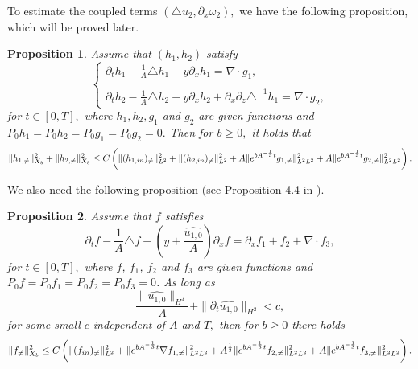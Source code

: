 \documentclass[12pt, reqno]{amsart}
\newtheorem{proposition}{Proposition}[section]
\numberwithin{equation}{section}
\begin{document}
	To estimate the coupled terms $(\triangle u_2,\partial_x\omega_2),$ we have 
	the following proposition, which will be proved later.
	\begin{proposition}\label{timespace1}
		Assume that $(h_1,h_2)$ satisfy
		\begin{equation*}\label{h1}
			\left\{
			\begin{array}{lr}
				\partial_th_1-\frac{1}{A}\triangle h_1+y\partial_x  h_1=
				\nabla\cdot g_1 , \\
				
				\\
				\partial_th_2-\frac{1}{A}\triangle h_2+y\partial_x  h_2+\partial_x\partial_z\triangle^{-1}h_1
				=\nabla\cdot g_2,
			\end{array}
			\right.
		\end{equation*}
		for $ t\in[0,T], $ where $ h_{1},h_{2}, g_{1} $ and $ g_{2} $ are given functions and $ P_{0}h_{1}=P_{0}h_{2}=P_{0}g_{1}=P_{0}g_{2}=0.$ Then for $ b\geq 0, $ it holds that 
		\begin{equation*}
			\|h_{1,\neq}\|^2_{X_b}+	\|h_{2,\neq}\|^2_{X_b}\leq C\left(\|(h_{1,\rm in})_{\neq}\|^2_{L^2}+
			\|(h_{2,\rm in})_{\neq}\|^2_{L^2}
			+A\|{\rm e}^{bA^{-\frac{1}{3}}t}g_{1,\neq}\|_{L^2L^2}^2
			+A\|{\rm e}^{bA^{-\frac{1}{3}}t}g_{2,\neq}\|_{L^2L^2}^2
			\right).
		\end{equation*}
	\end{proposition}
	
	
	We also need the following proposition (see Proposition 4.4 in \cite{wei2}).
	\begin{proposition}\label{timespace2}
		Assume that $f$ satisfies 
		$$\partial_t f-\frac{1}{A}\triangle f+\left(y+\frac{\widehat{u_{1,0}}}{A}\right)\partial_xf=\partial_xf_{1}+f_{2}
		+\nabla\cdot f_{3},$$
		for $ t\in[0,T], $ where $f$, $f_{1}$, $f_{2}$ and $f_{3}$ are given functions and $ P_{0}f=P_{0}f_{1}=P_{0}f_{2}=P_{0}f_{3}=0 $.
		As long as $$\frac{\|\widehat{u_{1,0}}\|_{H^4}}{A}+\|\partial_t\widehat{u_{1,0}}\|_{H^2}<c,$$
		for some small $c$ independent of $A$ and $T,$ then for $ b\geq0 $ there holds  
		\begin{equation*}
			\begin{aligned}
				\|f_{\neq}\|^2_{X_b}
				\leq C\left(\|(f_{\rm in})_{\neq}\|_{L^2}^2
				+\|{\rm e}^{bA^{-\frac{1}{3}}t}\nabla f_{1,\neq}\|_{L^2L^2}^2
				+A^{\frac{1}{3}}\|{\rm e}^{bA^{-\frac{1}{3}}t}f_{2,\neq}\|_{L^2L^2}^2 +A\|{\rm e}^{bA^{-\frac{1}{3}}t}f_{3,\neq}\|_{L^2L^2}^2\right).
			\end{aligned}
		\end{equation*}
	\end{proposition}
	
\end{document}
